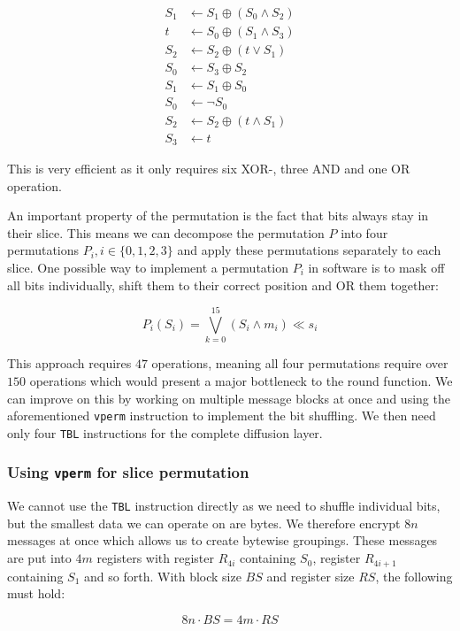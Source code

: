 \documentclass[12pt]{report}
\begin{document}
\begin{align*}
    S_1&\leftarrow S_1\oplus (S_0\land S_2) \\
    t&\leftarrow S_0\oplus (S_1\land S_3) \\
    S_2&\leftarrow S_2\oplus (t\lor S_1) \\
    S_0&\leftarrow S_3\oplus S_2 \\
    S_1&\leftarrow S_1\oplus S_0 \\
    S_0&\leftarrow \lnot S_0 \\
    S_2&\leftarrow S_2\oplus (t\land S_1) \\
    S_3&\leftarrow t
\end{align*}

This is very efficient as it only requires six XOR-, three AND and one OR
operation.

An important property of the permutation is the fact that bits always stay in
their slice. This means we can decompose the permutation $P$ into four
permutations $P_i,i\in\{0,1,2,3\}$ and apply these permutations
separately to each slice. One possible way to implement a permutation $P_i$ in
software is to mask off all bits individually, shift them to their correct
position and OR them together:

\[
    P_i(S_i)=\bigvee_{k=0}^{15}{(S_i\land m_i) \ll s_i}
\]

This approach requires $47$ operations, meaning all four permutations require
over $150$ operations which would present a major bottleneck to the round
function. We can improve on this by working on multiple message blocks at once
and using the aforementioned \texttt{vperm} instruction to implement the bit
shuffling. We then need only four \texttt{TBL} instructions for the complete
diffusion layer.

\subsubsection{Using \texttt{vperm} for slice permutation}

We cannot use the \texttt{TBL} instruction directly as we need to shuffle
individual bits, but the smallest data we can operate on are bytes. We
therefore encrypt $8n$ messages at once which allows us to create bytewise
groupings. These messages are put into $4m$ registers with register $R_{4i}$
containing $S_0$, register $R_{4i+1}$ containing $S_1$ and so forth. With block
size $BS$ and register size $RS$, the following must hold:

\[
    8n\cdot BS=4m\cdot RS
\]
\end{document}

